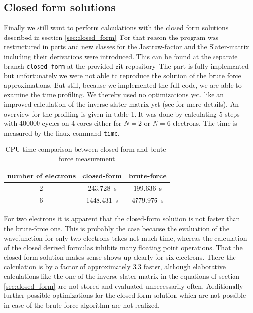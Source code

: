 \subsection{Closed form solutions}\label{sec:analytical}
Finally we still want to perform calculations with the closed form solutions described in section \ref{sec:closed_form}. For that reason the program was restructured in parts and new classes for the Jastrow-factor and the Slater-matrix including their derivations were introduced. This can be found at the separate branch \texttt{closed\_form} at the provided git repository. The part is fully implemented but unfortunately we were not able to reproduce the solution of the brute force approximations. But still, because we implemented the full code, we are able to examine the time profiling. We thereby used no optimizations yet, like an improved calculation of the inverse slater matrix yet (see \citet{hogberget2013} for more details). An overview for the profiling is given in table \ref{tab:cpu-time}. It was done by calculating $5$ steps with $400000$ cycles on $4$ cores either for $N=2$ or $N=6$ electrons. The time is measured by the linux-command \texttt{time}.
 \begin{table}[htbp]
    \centering
    \caption{CPU-time comparison between closed-form and brute-force measurement}
    \begin{tabular}{c|cc}
    \toprule
    number of electrons   & closed-form    & brute-force   \\
    \midrule
    $2$     & \SI{243.728}{\second}   & \SI{199.636}{\second}  \\
    $6$     & \SI{1448.431}{\second}  & \SI{4779.976}{\second}  \\
    \bottomrule
    \end{tabular}
    \label{tab:cpu-time}
\end{table}

For two electrons it is apparent that the closed-form solution is not faster than the brute-force one. This is probably the case because the evaluation of the wavefunction for only two electrons takes not much time, whereas the calculation of the closed derived formulas inhibits many floating point operations. That the closed-form solution makes sense shows up clearly for six electrons. There the calculation is by a factor of approximately $3.3$ faster, although elaborative calculations like the one of the inverse slater matrix in the equations of section \ref{sec:closed_form} are not stored and evaluated unnecessarily often. Additionally further possible optimizations for the closed-form solution which are not possible in case of the brute force algorithm are not realized. 

